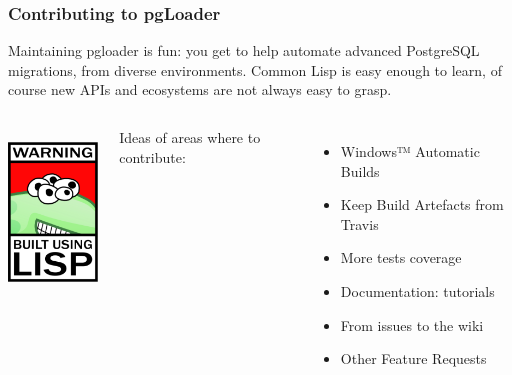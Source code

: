 \documentclass[xcolor=dvipsnames]{beamer}
\begin{document}
\begin{frame}[fragile]
  \frametitle{Contributing to pgLoader}

  Maintaining pgloader is fun: you get to help automate advanced PostgreSQL
  migrations, from diverse environments. Common Lisp is easy enough to
  learn, of course new APIs and ecosystems are not always easy to grasp.
  
  \begin{columns}[c]
    \begin{center}
      \includegraphics[height=12em]{lisplogo_warning2_256.png}
    \end{center}

    Ideas of areas where to contribute:
      \begin{itemize}
      \item Windows™ Automatic Builds
      \item Keep Build Artefacts from Travis
      \item More tests coverage
      \item Documentation: tutorials
      \item From issues to the wiki
      \item Other Feature Requests
    \end{itemize}
  \end{columns}  
\end{frame}
\end{document}
